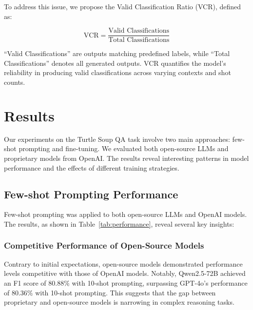 \documentclass[conference]{IEEEtran}
\begin{document}
To address this issue, we propose the Valid Classification Ratio (VCR), defined as:

\begin{equation}
\text{VCR} = \frac{\text{Valid Classifications}}{\text{Total Classifications}}
\end{equation}

“Valid Classifications” are outputs matching predefined labels, while “Total Classifications” denotes all generated outputs. VCR quantifies the model's reliability in producing valid classifications across varying contexts and shot counts.




\section{Results}
Our experiments on the Turtle Soup QA task involve two main approaches: few-shot prompting and fine-tuning. We evaluated both open-source LLMs and proprietary models from OpenAI. The results reveal interesting patterns in model performance and the effects of different training strategies.

\subsection{Few-shot Prompting Performance}
Few-shot prompting was applied to both open-source LLMs and OpenAI models. The results, as shown in Table~\ref{tab:performance}, reveal several key insights:

\subsubsection{Competitive Performance of Open-Source Models}
Contrary to initial expectations, open-source models demonstrated performance levels competitive with those of OpenAI models. Notably, Qwen2.5-72B achieved an F1 score of 80.88\% with 10-shot prompting, surpassing GPT-4o's performance of 80.36\% with 10-shot prompting. This suggests that the gap between proprietary and open-source models is narrowing in complex reasoning tasks.
\end{document}
